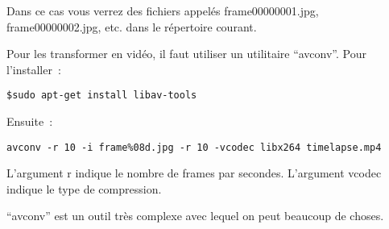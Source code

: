 Dans ce cas vous verrez des fichiers appelés frame00000001.jpg, frame00000002.jpg, etc. dans le répertoire courant.

Pour les transformer en vidéo, il faut utiliser un utilitaire ``avconv''. Pour l'installer~:

\begin{verbatim}
$sudo apt-get install libav-tools
\end{verbatim}

Ensuite~:

\begin{verbatim}
avconv -r 10 -i frame%08d.jpg -r 10 -vcodec libx264 timelapse.mp4
\end{verbatim}

L'argument r indique le nombre de frames par secondes. L'argument vcodec indique le type de compression.

``avconv'' est un outil très complexe avec lequel on peut beaucoup de choses.

